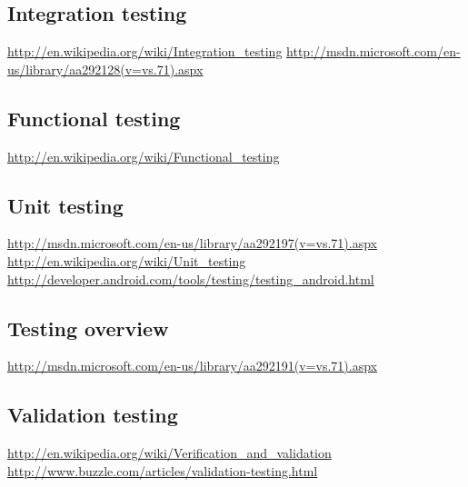 	\subsection{Integration testing}
	\url{http://en.wikipedia.org/wiki/Integration_testing}
	\url{http://msdn.microsoft.com/en-us/library/aa292128(v=vs.71).aspx}

	\subsection{Functional testing}
	\url{http://en.wikipedia.org/wiki/Functional_testing}

	\subsection{Unit testing}
	\url{http://msdn.microsoft.com/en-us/library/aa292197(v=vs.71).aspx}
	\url{http://en.wikipedia.org/wiki/Unit_testing}
	\url{http://developer.android.com/tools/testing/testing_android.html}

	\subsection{Testing overview}
	\url{http://msdn.microsoft.com/en-us/library/aa292191(v=vs.71).aspx}

	\subsection{Validation testing}
	\url{http://en.wikipedia.org/wiki/Verification_and_validation}
	\url{http://www.buzzle.com/articles/validation-testing.html}
